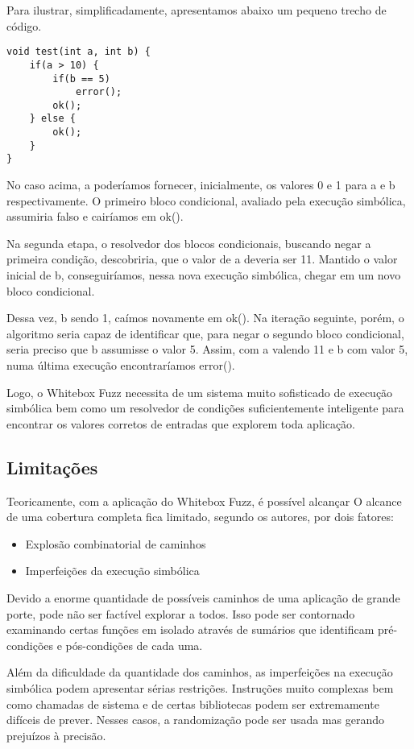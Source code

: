 			
			Para ilustrar, simplificadamente, apresentamos abaixo um pequeno trecho de código.
			\begin{lstlisting}[label=whitebox_fuzz_example,caption=Código de teste para ilustrar técnica]
void test(int a, int b) {
    if(a > 10) {
	    if(b == 5)
	        error();
	    ok();
    } else {
	    ok();
    }
}
			\end{lstlisting}


			No caso acima, a poderíamos fornecer, inicialmente, os valores 0 e 1 para a e b respectivamente.
			O primeiro bloco condicional, avaliado pela execução simbólica, assumiria falso e
			cairíamos em ok().
			

			Na segunda etapa, o resolvedor dos blocos condicionais, buscando negar a primeira condição,
			descobriria, que o valor de a deveria ser 11. Mantido o valor inicial de b, conseguiríamos,
			nessa nova execução simbólica, chegar em um novo bloco condicional.
			

			Dessa vez, b sendo 1, caímos novamente em ok().
			Na iteração seguinte, porém, o algoritmo seria capaz de identificar que, para negar
			o segundo bloco condicional, seria preciso que b assumisse o valor 5.
			Assim, com a valendo 11 e b com valor 5, numa última execução encontraríamos error().

			
			Logo, o Whitebox Fuzz necessita de um sistema muito sofisticado de execução simbólica
			bem como um resolvedor de condições suficientemente inteligente para encontrar os valores
			corretos de entradas que explorem toda aplicação.
			

		\subsection{Limitações}
			Teoricamente, com a aplicação do Whitebox Fuzz,  é possível alcançar 
			O alcance de uma cobertura completa fica limitado, segundo os autores, por dois fatores:
			\begin{itemize}
				\item{Explosão combinatorial de caminhos}
				\item{Imperfeições da execução simbólica}
			\end{itemize}
			Devido a enorme quantidade de possíveis caminhos de uma aplicação de grande porte,
			pode não ser factível explorar a todos.
			Isso pode ser contornado examinando certas funções em isolado através de sumários que
			identificam pré-condições e pós-condições de cada uma.
			
			Além da dificuldade da quantidade dos caminhos, as imperfeições na execução simbólica
			podem apresentar sérias restrições. Instruções muito complexas bem como chamadas de sistema
			e de certas bibliotecas podem ser extremamente difíceis de prever.
			Nesses casos, a randomização pode ser usada mas gerando prejuízos à precisão.
			
